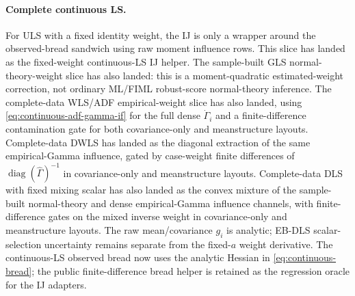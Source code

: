 \documentclass[11pt]{article}
\newcommand{\diag}{\operatorname{diag}}
\theoremstyle{plain}
\theoremstyle{remark}
\begin{document}
\paragraph{Complete continuous LS.}
For ULS with a fixed identity weight, the IJ is only a wrapper around the
observed-bread sandwich using raw moment influence rows. This slice has landed
as the fixed-weight continuous-LS IJ helper. The sample-built GLS
normal-theory-weight slice has also landed: this is a moment-quadratic
estimated-weight correction, not ordinary ML/FIML robust-score normal-theory
inference. The complete-data WLS/ADF empirical-weight slice has also landed,
using \eqref{eq:continuous-adf-gamma-if} for the full dense
$\dot\Gamma_i$ and a finite-difference contamination gate for both
covariance-only and meanstructure layouts. Complete-data DWLS has landed as
the diagonal extraction of the same empirical-Gamma influence, gated by
case-weight finite differences of $\diag(\hat\Gamma)^{-1}$ in covariance-only
and meanstructure layouts. Complete-data DLS with fixed mixing scalar has also
landed as the convex mixture of the sample-built normal-theory and dense
empirical-Gamma influence channels, with finite-difference gates on the mixed
inverse weight in covariance-only and meanstructure layouts. The raw
mean/covariance $g_i$ is analytic; EB-DLS scalar-selection uncertainty remains
separate from the fixed-$a$ weight derivative. The continuous-LS observed bread
now uses the analytic Hessian in \eqref{eq:continuous-bread}; the public
finite-difference bread helper is retained as the regression oracle for the IJ
adapters.
\end{document}
